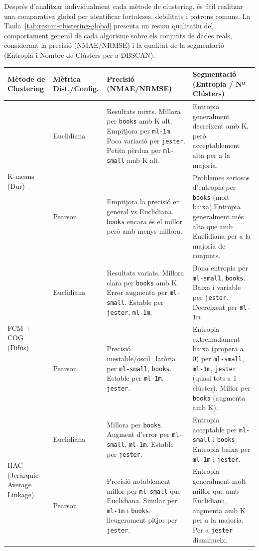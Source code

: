 \documentclass[a4paper,12pt]{report}
\begin{document}
Després d'analitzar individualment cada mètode de clustering, és útil realitzar una comparativa global per identificar fortaleses, debilitats i patrons comuns. La Taula~\ref{tab:resum-clustering-global} presenta un resum qualitatiu del comportament general de cada algorisme sobre els conjunts de dades reals, considerant la precisió (NMAE/NRMSE) i la qualitat de la segmentació (Entropia i Nombre de Clústers per a DBSCAN).

\begin{table}[H]
    \centering
    \small %
    \begin{tabular}{|p{2.5cm}|p{3cm}|p{4.5cm}|p{4.5cm}|}
    \hline
    \textbf{Mètode de Clustering} & \textbf{Mètrica Dist./Config.} & \textbf{Precisió (NMAE/NRMSE)} & \textbf{Segmentació (Entropia / Nº Clústers)} \\ \hline
    
    \multirow{2}{=}{K-means (Dur)} & Euclidiana & Resultats mixts. Millora per \texttt{books} amb K alt. Empitjora per \texttt{ml-1m}. Poca variació per \texttt{jester}. Petita pèrdua per \texttt{ml-small} amb K alt. & Entropia generalment decreixent amb K, però acceptablement alta per a la majoria. \\ \cline{2-4}
     & Pearson & Empitjora la precisió en general vs Euclidiana. \texttt{books} encara és el millor però amb menys millora. & Problemes seriosos d'entropia per \texttt{books} (molt baixa).Entropia generalment més alta que amb Euclidiana per a la majoria de conjunts. \\ \hline
     
    \multirow{2}{=}{FCM + COG (Difús)} & Euclidiana & Resultats variats. Millora clara per \texttt{books} amb K. Error augmenta per \texttt{ml-small}. Estable per \texttt{jester}, \texttt{ml-1m}. & Bona entropia per \texttt{ml-small}, \texttt{books}. Baixa i variable per \texttt{jester}. Decreixent per \texttt{ml-1m}. \\ \cline{2-4}
     & Pearson & Precisió inestable/oscil·latòria per \texttt{ml-small}, \texttt{books}. Estable per \texttt{ml-1m}, \texttt{jester}. & Entropia extremadament baixa (propera a 0) per \texttt{ml-small}, \texttt{ml-1m}, \texttt{jester} (quasi tots a 1 clúster). Millor per \texttt{books} (augmenta amb K). \\ \hline
     
    \multirow{2}{=}{HAC (Jeràrquic - Average Linkage)} & Euclidiana & Millora per \texttt{books}. Augment d'error per \texttt{ml-small}, \texttt{ml-1m}. Estable per \texttt{jester}. & Entropia acceptable per \texttt{ml-small} i \texttt{books}. Entropia baixa per \texttt{ml-1m} i \texttt{jester}. \\ \cline{2-4}
     & Pearson & Precisió notablement millor per \texttt{ml-small} que Euclidiana. Similar per \texttt{ml-1m} i \texttt{books}. lleugerament pitjor per \texttt{jester}. & Entropia generalment molt millor que amb Euclidiana, augmenta amb K per a la majoria. Per a \texttt{jester} disminueix. \\ \hline
     

\end{tabular}
\end{table}
\end{document}

